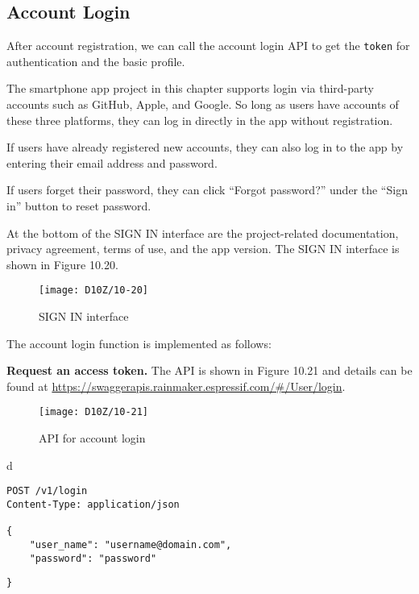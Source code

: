 \documentclass[a4paper,12pt]{book}
\begin{document}

\subsection{Account Login}
After account registration, we can call the account login API to get the \verb|token| for authentication and the basic profile.

The smartphone app project in this chapter supports login via third-party accounts such as GitHub, Apple, and Google. So long as users have accounts of these three platforms, they can log in directly in the app without registration.

If users have already registered new accounts, they can also log in to the app by entering their email address and password.

If users forget their password, they can click “Forgot password?” under the “Sign in” button to reset password.

At the bottom of the SIGN IN interface are the project-related documentation, privacy agreement, terms of use, and the app version. The SIGN IN interface is shown in Figure 10.20.

\begin{figure}[ht]
    \centering
    \texttt{[image: D10Z/10-20]}
    \caption{SIGN IN interface}
\end{figure}

The account login function is implemented as follows:

\textbf{Request an access token.} The API is shown in Figure 10.21 and details can be found at \url{https://swaggerapis.rainmaker.espressif.com/\#/User/login}.

\begin{figure}[ht]
    \centering
    \texttt{[image: D10Z/10-21]}
    \caption{API for account login}
\end{figure}

\begin{codebloc}
\begin{tabular}{d}
\vspace{2pt}
\begin{verbatim}
POST /v1/login
Content-Type: application/json

{
    "user_name": "username@domain.com",
    "password": "password"
\end{verbatim}
\verb|}|
\end{tabular}
\end{codebloc}
\end{document}
